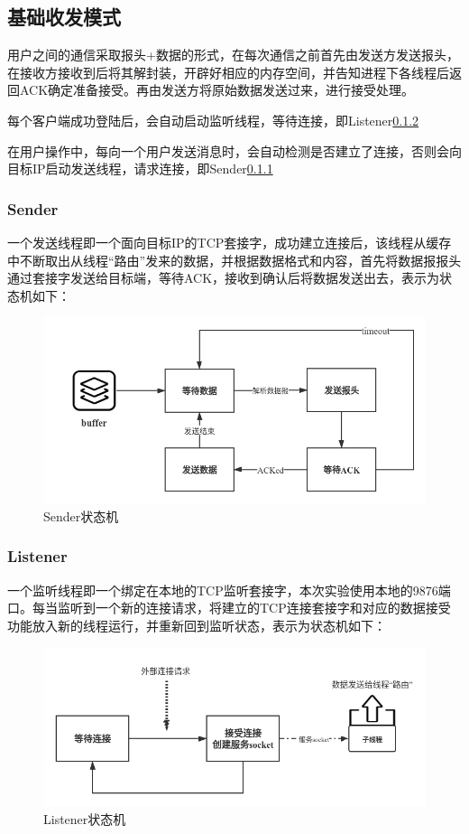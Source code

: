 \documentclass[UTF8]{ctexart}
\begin{document}
\subsection{基础收发模式}

用户之间的通信采取报头+数据的形式，在每次通信之前首先由发送方发送报头，在接收方接收到后将其解封装，开辟好相应的内存空间，并告知进程下各线程后返回ACK确定准备接受。再由发送方将原始数据发送过来，进行接受处理。

每个客户端成功登陆后，会自动启动监听线程，等待连接，即Listener\ref{listener}

在用户操作中，每向一个用户发送消息时，会自动检测是否建立了连接，否则会向目标IP启动发送线程，请求连接，即Sender\ref{sender}

\subsubsection{Sender}\label{sender}
一个发送线程即一个面向目标IP的TCP套接字，成功建立连接后，该线程从缓存中不断取出从线程“路由”发来的数据，并根据数据格式和内容，首先将数据报报头通过套接字发送给目标端，等待ACK，接收到确认后将数据发送出去，表示为状态机如下：
\begin{figure}[H]
    \centering
    \includegraphics[scale=0.4]{senderstate.png}
    \caption{Sender状态机}
\end{figure}


\subsubsection{Listener}\label{listener}
一个监听线程即一个绑定在本地的TCP监听套接字，本次实验使用本地的9876端口。每当监听到一个新的连接请求，将建立的TCP连接套接字和对应的数据接受功能放入新的线程运行，并重新回到监听状态，表示为状态机如下：
\begin{figure}[H]
    \centering
    \includegraphics[scale=0.4]{listenerstate.png}
    \caption{Listener状态机}
\end{figure}
\end{document}
